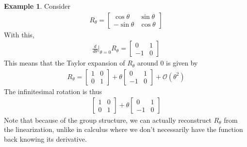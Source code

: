 \documentclass{book}
\theoremstyle{definition}
\newtheorem{exmp}{Example}[section]
\newcommand{\f}[2]{\frac{#1}{#2}}
\begin{document}
\begin{exmp}
	Consider 
	\begin{align}
	R_\theta = \begin{bmatrix}
	\cos\theta & \sin\theta \\ -\sin\theta & \cos\theta
	\end{bmatrix}
	\end{align}
	With this,
	\begin{align}
	\f{d}{d\theta}\bigg\vert_{\theta = 0} R_\theta = \begin{bmatrix}
	0 & 1 \\ -1 & 0
	\end{bmatrix}
	\end{align}
	This means that the Taylor expansion of $R_\theta$ around 0 is given by
	\begin{align}
	R_\theta = \begin{bmatrix}
	1 & 0 \\ 0 & 1 
	\end{bmatrix} + \theta \begin{bmatrix}
	0 & 1 \\ -1 & 0
	\end{bmatrix} + \mathcal{O}(\theta^2)
	\end{align}
	The infinitesimal rotation is thus 
	\begin{align}
	\begin{bmatrix}
	1 & 0 \\ 0 & 1 
	\end{bmatrix} + \theta \begin{bmatrix}
	0 & 1 \\ -1 & 0
	\end{bmatrix}
	\end{align}
	Note that because of the group structure, we can actually reconstruct $R_\theta$ from the linearization, unlike in calculus where we don't necessarily have the function back knowing its derivative.  
 	
\end{exmp}



















    
\end{document}
